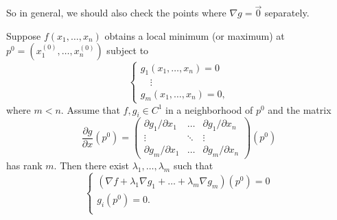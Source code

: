 \begin{remark}
  So in general, we should also check the
  points where $\nabla g = \vec{0}$ separately.
\end{remark}

\begin{theorem}
  Suppose $f(x_1, \dots, x_n)$ obtains a local
  minimum (or maximum) at $p^0 = (x_1^{(0)}, \dots, x_n^{(0)})$
  subject to
  \[
  \begin{cases}
    g_1(x_1, \dots, x_n) = 0 \\
    \quad \vdots \\
    g_m(x_1, \dots, x_n) = 0,
  \end{cases}
  \]
  where $m < n$. Assume that $f, g_i \in C^1$ in a
  neighborhood of $p^0$ and the matrix
  \[
    \frac{\partial g}{\partial x}(p^0)
    = \begin{pmatrix}
      \partial g_1 / \partial x_1 & \dots & \partial g_1 / \partial x_n \\
      \vdots & \ddots & \vdots \\
      \partial g_m / \partial x_1 & \dots & \partial g_m / \partial x_n
    \end{pmatrix}(p^0)
  \]
  has rank $m$. Then there exist
  $\lambda_1, \dots, \lambda_m$ such that
  \[
    \begin{cases}
      (\nabla f + \lambda_1 \nabla g_1 + \dots + \lambda_m \nabla g_m)(p^0) = 0 \\
      g_i(p^0) = 0. \\
    \end{cases}
  \]
\end{theorem}

